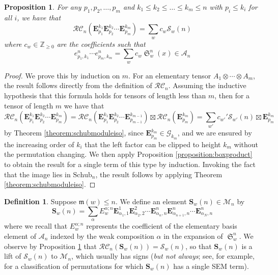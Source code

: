 \documentclass{amsart}
\newtheorem{proposition}[lemma]{Proposition}
\theoremstyle{definition}
\newtheorem{definition}[lemma]{Definition}
\theoremstyle{remark}
\numberwithin{equation}{subsection}
\DeclareMathOperator{\sch}{\mathfrak{S}}
\newcommand{\grass}{\mathcal{G}}
\newcommand{\RC}{\mathcal{RC}}
\newcommand{\coma}{\mathcal{A}}
\newcommand{\maxd}{\mathfrak{m}}
\begin{document}
\begin{proposition} \label{proposition:eproductworks}
For any $p_1,p_2,\ldots,p_m$ and $k_1\leq k_2\leq\ldots\leq k_m\leq n$ with $p_i\leq k_i$ for all $i$, we have that
$$\RC_n(\mathbf{E}_{p_1}^{k_1}\mathbf{E}_{p_2}^{k_2}\cdots\mathbf{E}_{p_m}^{k_m}) = \sum_{w} c_w\mathcal{S}_w(n)$$
where $c_w\in \mathbb{Z}_{\geq 0}$ are the coefficients such that
$$e_{p_1,k_1}^n\cdots e_{p_m,k_m}^n = \sum_w c_w \sch_w^n(x)\in \coma_n$$
\end{proposition}
\begin{proof}
We prove this by induction on $m$. For an elementary tensor $A_1\otimes \cdots \otimes A_m$, the result follows directly from the definition of $\RC_n$. Assuming the inductive hypothesis that this formula holds for tensors of length less than $m$, then for a tensor of length $m$ we have that
$$\RC_n(\mathbf{E}_{p_1}^{k_1}\mathbf{E}_{p_2}^{k_2}\cdots\mathbf{E}_{p_m}^{k_m}) = \RC_n(\mathbf{E}_{p_1}^{k_1}\mathbf{E}_{p_2}^{k_2}\cdots\mathbf{E}_{p_{m-1}}^{k_{m-1}})\boxtimes \RC_n(\mathbf{E}_{p_m}^{k_m})=\sum_{w'} c_{w'}' \mathcal{S}_{w'}(n)\boxtimes \mathbf{E}_{p_m}^{k_m}$$
by Theorem \ref{theorem:schubmoduleiso}, since $\mathbf{E}_{p_m}^{k_m}\in\grass_{k_m}$, and we are ensured by the increasing order of $k_i$ that the left factor can be clipped to height $k_m$ without the permutation changing. We then apply Proposition \ref{proposition:boxproduct} to obtain the result for a single term of this type by induction. Invoking the fact that the image lies in $\mathrm{Schub}_n$, the result follows by applying Theorem \ref{theorem:schubmoduleiso}.
\end{proof}


\begin{definition}
  Suppose $\maxd(w)\leq n$. We define an element $\mathbf{S}_w(n)\in \mathcal{M}_n$ by
  $$\mathbf{S}_w(n) = \sum_{\alpha} E_w^{\alpha;n}\mathbf{E}_{\alpha_1,1}^1 \mathbf{E}_{\alpha_2,2}^2 \cdots  \mathbf{E}_{\alpha_n,n}^n\mathbf{E}_{\alpha_{n+1}, n}^n\cdots \mathbf{E}_{\alpha_N,n}^n$$
  where we recall that $E_w^{\alpha;n}$ represents the coefficient of the elementary basis element of $\coma_n$ indexed by the weak composition $\alpha$ in the expansion of $\sch_w^n$. We observe by Proposition \ref{proposition:eproductworks} that $\RC_n(\mathbf{S}_w(n)) = \mathcal{S}_w(n)$, so that $\mathbf{S}_w(n)$ is a lift of $\mathcal{S}_w(n)$ to $\mathcal{M}_n$, which usually has signs (\emph{but not always}; see, for example, \cite{woodruff2025single} for a classification of permutations for which $\mathbf{S}_w(n)$ has a single SEM term).
\end{definition}
\end{document}
